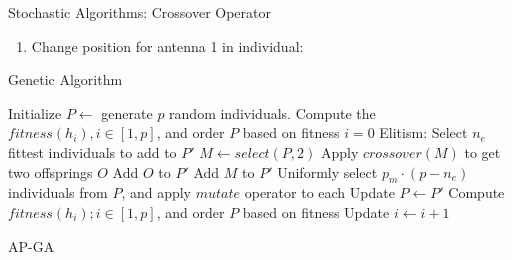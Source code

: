 \documentclass{beamer}
\def\HiLi{\leavevmode\rlap{\hbox to \hsize{\color{green!50}\leaders\hrule height .8\baselineskip depth .5ex\hfill}}}
\begin{document}
\begin{frame}[t]{Stochastic Algorithms: Crossover Operator}
\begin{enumerate}
        \item Change position for antenna 1 in individual:\par
            \begin{minipage}[t]{\linewidth}
                \centering
            \end{minipage}
    \end{enumerate}
\end{frame}



\begin{frame}{Genetic Algorithm}
    \begin{spacing}{0.6}
        \fontsize{8}{12}\selectfont
        \begin{algorithm}[H]
            Initialize $P\leftarrow$ generate $p$ random individuals.
            Compute the $fitness(h_i), i \in [1,p]$, and order $P$ based on fitness\;
            $i=0$ \;
             {
                Elitism: Select $n_e$ fittest individuals to add to $P'$ \;
                 {
                    $M \leftarrow select(P, 2)$\;
                    \HiLi {} {
                        Apply $crossover(M)$ to get two offsprings $O$ \;
                        Add $O$ to $P'$ \;
                    }
                    { Add $M$ to $P'$ \; }
                }
                Uniformly select $p_{m} \cdot (p - n_e)$ individuals from $P$, and apply $mutate$ operator to each \;
                Update $P\leftarrow P'$ \;
                Compute $fitness(h_i); i \in [1, p]$, and order $P$ based on fitness \;
                Update $i \leftarrow i + 1$ \;
            }
            \caption{AP-GA}
        \end{algorithm}
    \end{spacing}
\end{frame}
\end{document}
